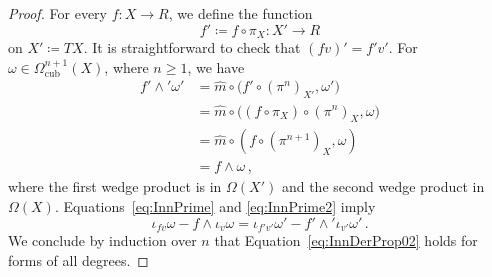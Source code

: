 \documentclass[12pt,reqno, a4paper]{amsart}
\numberwithin{equation}{section}
\theoremstyle{plain}
\theoremstyle{definition}
\theoremstyle{remark}
\newcommand{\Rmult}{\hat{m}}
\begin{document}
\begin{proof}
For every $f\colon X \to R$, we define the function
\begin{equation*}
  f' \coloneqq f \circ \pi_X\colon X' \longrightarrow R
\end{equation*}
on $X' \coloneqq TX$. It is straightforward to check that $(fv)' = f'v'$. For $\omega \in \Omega^{n+1}_\mathrm{cub}(X)$, where $n \geq 1$, we have
\begin{equation}
\label{eq:InnPrime2}
\begin{split}
  f' \wedge' \omega'
  &= \Rmult \circ \bigl( f' \circ (\pi^n)_{X'}, \omega' \bigr)
  \\
  &= \Rmult \circ \bigl( (f \circ \pi_X) \circ (\pi^n)_X, \omega \bigr)
  \\
  &= \Rmult \circ (f \circ (\pi^{n+1})_X, \omega)
  \\
  &= f \wedge \omega
  \,,
\end{split}
\end{equation}
where the first wedge product is in $\Omega(X')$ and the second wedge product in $\Omega(X)$. Equations~\eqref{eq:InnPrime} and \eqref{eq:InnPrime2} imply
\begin{equation*}
  \iota_{fv} \omega - f \wedge \iota_v \omega
  =
  \iota_{f'v'} \omega' - f' \wedge' \iota_{v'} \omega'
  \,.
\end{equation*}
We conclude by induction over $n$ that Equation~\eqref{eq:InnDerProp02} holds for forms of all degrees.


\end{proof}
\end{document}
